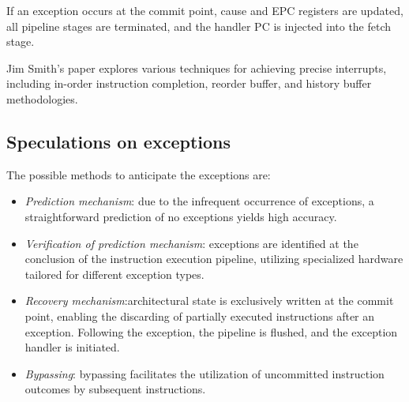 If an exception occurs at the commit point, cause and EPC registers are updated, all pipeline stages are terminated, and the handler PC is injected into the fetch stage.

Jim Smith's paper explores various techniques for achieving precise interrupts, including in-order instruction completion, reorder buffer, and history buffer methodologies.

\subsection{Speculations on exceptions}
The possible methods to anticipate the exceptions are: 
\begin{itemize}
    \item \textit{Prediction mechanism}: due to the infrequent occurrence of exceptions, a straightforward prediction of no exceptions yields high accuracy.
    \item \textit{Verification of prediction mechanism}: exceptions are identified at the conclusion of the instruction execution pipeline, utilizing specialized hardware tailored for different exception types.
    \item \textit{Recovery mechanism}:architectural state is exclusively written at the commit point, enabling the discarding of partially executed instructions after an exception.
        Following the exception, the pipeline is flushed, and the exception handler is initiated.
    \item \textit{Bypassing}: bypassing facilitates the utilization of uncommitted instruction outcomes by subsequent instructions.
\end{itemize}